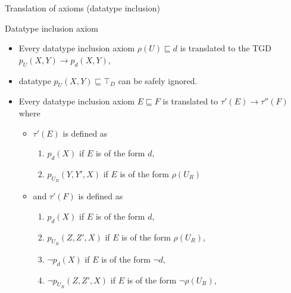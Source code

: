 \documentclass{beamer}
\begin{document}
 \begin{frame}{Translation of axioms (datatype  inclusion)}
  
  
  
  \begin{block}{Datatype inclusion axiom}
  \begin{itemize}
  \tiny
 \item Every datatype inclusion axiom  $\rho(U) \sqsubseteq d$  is  translated to the TGD  $p_U(X,Y) \rightarrow p_{d} (X,Y)$,
 \item datatype $p_U(X,Y) \sqsubseteq \top_D$ can be safely ignored.
 \item  Every datatype  inclusion axiom $E \sqsubseteq F$ is translated to  $\tau' (E)  \rightarrow \tau''(F)$ where
 \begin{itemize}
  \tiny
 \item $ \tau'(E) $ is defined as
  \begin{enumerate}
 \tiny
 \item $p_d(X)$ if $E$ is of the form $d$,
  \item $p_{U_R}(Y,Y', X)$ if $E$ is of the form $\rho(U_R)$
 \end{enumerate}
 
  \item and $  \tau'(F) $ is defined as
  
   \begin{enumerate}
 \tiny
 \item $p_d(X)$ if $E$ is of the form $d$,
  \item $p_{U_R}(Z,Z', X)$ if $E$ is of the form $\rho(U_R)$,
  \item $\neg p_d(X)$ if $E$ is of the form $\neg d$,
   \item $\neg p_{U_R}(Z,Z', X)$ if $E$ is of the form $\neg \rho(U_R)$,
 \end{enumerate}
 
 \end{itemize}
 \end{itemize}
  \end{block}
 
 \end{frame}

 
 
 
 \begin{frame}
 
 \end{frame}
 
 
 

 
\end{document}
